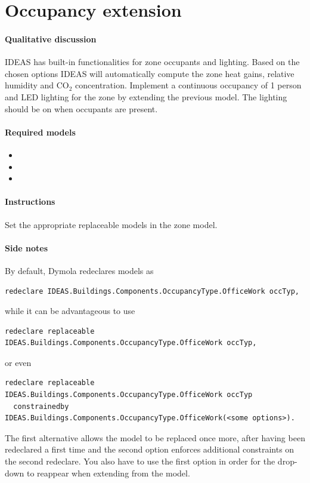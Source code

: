 \documentclass[10pt,a4paper]{article}
\begin{document}
\newpage

\section{Occupancy extension}
\paragraph{Qualitative discussion}
IDEAS has built-in functionalities for zone occupants and lighting.
Based on the chosen options IDEAS will automatically compute
the zone heat gains, relative humidity and CO$_2$ concentration.
Implement a continuous occupancy of 1 person and LED
lighting for the zone by extending the previous model.
The lighting should be on when occupants are present.

\paragraph{Required models}
\begin{itemize}
\item {}
\item {}
\item {}
\end{itemize}

\paragraph{Instructions}
Set the appropriate replaceable models in the zone model.

\paragraph{Side notes}
By default, Dymola redeclares models as
\begin{verbatim}
redeclare IDEAS.Buildings.Components.OccupancyType.OfficeWork occTyp,
\end{verbatim}
while it can be advantageous to use
\begin{verbatim}
redeclare replaceable IDEAS.Buildings.Components.OccupancyType.OfficeWork occTyp,
\end{verbatim}
or even
\begin{verbatim}
redeclare replaceable IDEAS.Buildings.Components.OccupancyType.OfficeWork occTyp
  constrainedby IDEAS.Buildings.Components.OccupancyType.OfficeWork(<some options>).
\end{verbatim}
The first alternative allows the model to be replaced once more, 
after having been redeclared a first time and the second option
enforces additional constraints on the second redeclare.
You also have to use the first option in order for the drop-down
to reappear when extending from the model.
\end{document}

